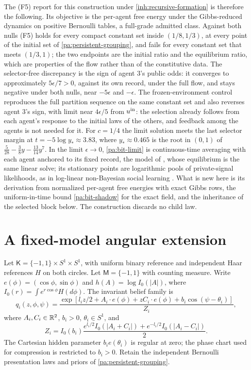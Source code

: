 The (F5) report for this construction under \cref{inh:recursive-formation} is therefore the following. Its objective is the per-agent free energy under the Gibbs-reduced dynamics on positive Bernoulli tables, a full-grade admitted class. Against both nulls (F5) holds for every compact constant set inside $(1/8,1/3)$, at every point of the initial set of \cref{pa:persistent-grouping}, and fails for every constant set that meets $(1/3,1)$; the two endpoints are the initial ratio and the equilibrium ratio, which are properties of the flow rather than of the constitutive data. The selector-free discrepancy is the sign of agent $3$'s public odds: it converges to approximately $5\epsilon/7>0$, against its own record, under the full flow, and stays negative under both nulls, near $-5\epsilon$ and $-\epsilon$. The frozen-environment control reproduces the full partition sequence on the same constant set and also reverses agent $3$'s sign, with limit near $4\epsilon/5$ from $u^{\rm in}$: the selection already follows from each agent's response to the initial laws of the others, and feedback among the agents is not needed for it. For $c=1/4$ the limit solution meets the last selector margin at $t=-5\log y_*\approx3.83$, where $y_*\approx0.465$ is the root in $(0,1)$ of $\tfrac5{28}-\tfrac38y-\tfrac{13}{14}y^7$. In the limit $\epsilon\to0$, \cref{pa:bit-limit} is continuous-time averaging \citep{DeGroot1974} with each agent anchored to its fixed record, the model of \citet{FriedkinJohnsen1990}, whose equilibrium is the same linear solve; its stationary points are logarithmic pools of private-signal likelihoods, as in log-linear non-Bayesian social learning \citep{JadbabaieEtAl2012}. What is new here is its derivation from normalized per-agent free energies with exact Gibbs rows, the uniform-in-time bound \cref{pa:bit-shadow} for the exact field, and the inheritance of the selected block below. The construction discards no child law.

\section{A fixed-model angular extension}

Let $\mathsf K=\{-1,1\}\times S^1\times S^1$, with uniform binary reference and independent Haar references $H$ on both circles. Let $\mathsf M=\{-1,1\}$ with counting measure. Write $e(\phi)=(\cos\phi,\sin\phi)$ and
$h(A)=\log I_0(|A|)$, where $I_0(r)=\int e^{r\cos\phi}H(d\phi)$. The invariant belief family is
\begin{equation}
 q_i(z,\phi,\psi)=
 \frac{\exp[l_i z/2+A_i\cdot e(\phi)+zC_i\cdot e(\phi)
                    +b_i\cos(\psi-\theta_i)]}{Z_i},
 \label{pa:angular-family}
\end{equation}
where $A_i,C_i\in\mathbb R^2$, $b_i>0$, $\theta_i\in S^1$, and
\begin{equation}
 Z_i=I_0(b_i)
 \frac{e^{l_i/2}I_0(|A_i+C_i|)+e^{-l_i/2}I_0(|A_i-C_i|)}2.
 \label{pa:angular-normalizer}
\end{equation}
The Cartesian hidden parameter $b_i e(\theta_i)$ is regular at zero; the phase chart used for compression is restricted to $b_i>0$. Retain the independent Bernoulli presentation laws and priors of \cref{pa:persistent-grouping}.

